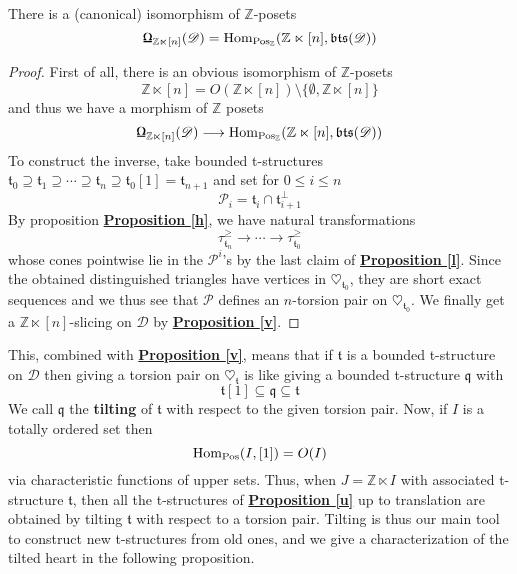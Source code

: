 \begin{prop}\label{qqa}
There is a (canonical) isomorphism of $\mathbb{Z}$-posets  $$\textnormal{\Libra}_{ \mathbb{Z} \ltimes [n] }(\mathscr{D})=\textnormal{Hom}_{\textnormal{Pos}_{\mathbb{Z}}}(\mathbb{Z} \ltimes [n], \mathfrak{bts}(\mathscr{D}))$$
\end{prop}

\begin{proof}
First of all, there is an obvious isomorphism of $\mathbb{Z}$-posets $$\mathbb{Z} \ltimes [n]=O(\mathbb{Z} \ltimes [n]) \setminus \{ \emptyset, \mathbb{Z} \ltimes [n] \}$$ and thus we have a morphism of $\mathbb{Z}$ posets $$\textnormal{\Libra}_{ \mathbb{Z} \ltimes [n] }(\mathscr{D}) \longrightarrow \textnormal{Hom}_{\textnormal{Pos}_{\mathbb{Z}}}(\mathbb{Z} \ltimes [n], \mathfrak{bts}(\mathscr{D}))$$
To construct the inverse, take bounded t-structures $\mathfrak{t}_0 \supseteq \mathfrak{t}_1 \supseteq \cdots \supseteq \mathfrak{t}_n \supseteq \mathfrak{t}_0[1]=\mathfrak{t}_{n+1}$ and set for $0 \le i \le n$ $$\mathscr{P}_i=\mathfrak{t}_i \cap \mathfrak{t}_{i+1}^{\perp}$$
By proposition \hyperref[h]{\textbf{Proposition \ref*{h}}}, we have natural transformations $$\tau_{\mathfrak{t}_n}^{\ge} \longrightarrow \cdots \longrightarrow \tau_{\mathfrak{t}_0}^{\ge}$$
whose cones pointwise lie in the $\mathscr{P}^i$'s by the last claim of \hyperref[l]{\textbf{Proposition \ref*{l}}}. Since the obtained distinguished triangles have vertices in $\heartsuit_{\mathfrak{t}_0}$, they are short exact sequences and we thus see that $\mathscr{P}$ defines an $n$-torsion pair on $\heartsuit_{\mathfrak{t}_0}$. We finally get a $\mathbb{Z} \ltimes [n]$-slicing on $\mathscr{D}$ by \hyperref[v]{\textbf{Proposition \ref*{v}}}.

\end{proof} 

This, combined with \hyperref[v]{\textbf{Proposition \ref*{v}}}, means that if $\mathfrak{t}$ is a bounded t-structure on $\mathscr{D}$ then giving a torsion pair on $\heartsuit_{\mathfrak{t}}$ is like giving a bounded t-structure $\mathfrak{q}$ with $$\mathfrak{t}[1] \subseteq \mathfrak{q} \subseteq \mathfrak{t}$$
We call $\mathfrak{q}$ the \textbf{tilting} of $\mathfrak{t}$ with respect to the given torsion pair. Now, if $I$ is a totally ordered set then
$$\textnormal{Hom}_{\textnormal{Pos}}(I,[1])=O(I)$$ 
via characteristic functions of upper sets. Thus, when $J=\mathbb{Z} \ltimes I$ with associated t-structure $\mathfrak{t}$, then all the t-structures of \hyperref[u]{\textbf{Proposition \ref*{u}}} up to translation are obtained by tilting $\mathfrak{t}$ with respect to a torsion pair. Tilting is thus our main tool to construct new t-structures from old ones, and we give a characterization of the tilted heart in the following proposition. 

